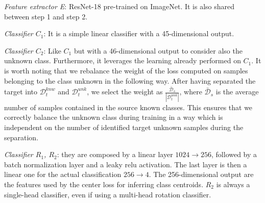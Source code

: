 \documentclass[10pt,twocolumn,letterpaper]{article}
\begin{document}
{\it Feature extractor E}: ResNet-18 pre-trained on ImageNet. It is also shared between step 1 and step 2.

{\it Classifier $C_1$}:
It is a simple linear classifier with a 45-dimensional output.

{\it Classifier $C_2$}:
Like $C_1$ but with a 46-dimensional output to consider also the unknown class. Furthermore, it leverages the learning already performed on $C_1$.
It is worth noting that we rebalance the weight of the loss computed on samples belonging to the class unknown in the following way.
After having separated the target into $\mathcal{D}_t^{knw}$ and $\mathcal{D}_t^{unk}$,
we select the weight as $\frac{\mathcal{\bar{D}}_s}{|\mathcal{D}_t^{unk}|}$,
where ${\mathcal{\bar{D}}_s}$ is the average number of samples contained in the source known classes.
This ensures that we correctly balance the unknown class during training in a way which is independent
on the number of identified target unknown samples during the separation.

{\it Classifier $R_1$, $R_2$}: 
they are composed by a linear layer $1024\to 256$, followed by a batch normalization layer and a leaky relu activation.
The last layer is then a linear one for the actual classification $256\to 4$.
The 256-dimensional output are the features used by the center loss for inferring class centroids.
$R_2$ is always a single-head classifier, even if using a multi-head rotation classifier.
\end{document}
